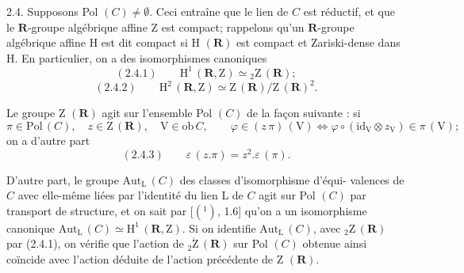 
2.4. Supposons Pol $(C) \neq \emptyset$. Ceci entraîne que le lien de $C$ est réductif,
et que le $\mathbf{R}$-groupe algébrique affine Z est compact; rappelons qu'un
$\mathbf{R}$-groupe algébrique affine H est dit compact si H $(\mathbf{R})$ est compact et
Zariski-dense dans H. En particulier, on a des isomorphismes canoniques
\[ (2.4.1) \qquad \mathrm{H}^1\,(\mathbf{R}, \mathrm{Z}) \simeq {}_2\mathrm{Z}\,(\mathbf{R}); \]
\[ (2.4.2) \qquad \mathrm{H}^2\,(\mathbf{R}, \mathrm{Z}) \simeq \mathrm{Z}\,(\mathbf{R})/\mathrm{Z}\,(\mathbf{R})^2. \]

Le groupe Z $(\mathbf{R})$ agit sur l'ensemble Pol $(C)$ de la façon suivante : si
\[ \pi \in \mathrm{Pol}\,(C), \quad z \in \mathrm{Z}\,(\mathbf{R}), \quad \mathrm{V} \in \mathrm{ob}\, C, \qquad \varphi \in (z\,\pi)\,(\mathrm{V}) \iff \varphi \circ (\mathrm{id}_{\mathrm{V}} \otimes z_{\mathrm{V}}) \in \pi\,(\mathrm{V}); \]
on a d'autre part
\[ (2.4.3) \qquad \varepsilon\,(z.\pi) = z^2.\varepsilon\,(\pi). \]

D'autre part, le groupe $\mathrm{Aut}_{\mathrm{L}}\,(C)$ des classes d'isomorphisme d'équi-%
valences de $C$ avec elle-même liées par l'identité du lien L de $C$ agit
sur Pol $(C)$ par transport de structure, et on sait par [$(^1)$, 1.6] qu'on a
un isomorphisme canonique $\mathrm{Aut}_{\mathrm{L}}\,(C) \simeq \mathrm{H}^1\,(\mathbf{R}, \mathrm{Z})$. Si on identifie $\mathrm{Aut}_{\mathrm{L}}\,(C)$,
avec ${}_2\mathrm{Z}\,(\mathbf{R})$ par (2.4.1), on vérifie que l'action de ${}_2\acute{\mathrm{Z}}\,(\mathbf{R})$ sur Pol $(C)$
obtenue ainsi coïncide avec l'action déduite de l'action précédente de Z $(\mathbf{R})$.

